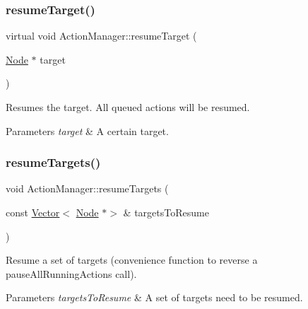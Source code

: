 \subsubsection{\texorpdfstring{resume\+Target()}{resumeTarget()}\hspace{0.1cm}{\footnotesize\ttfamily [2/2]}}
{\footnotesize\ttfamily virtual void Action\+Manager\+::resume\+Target (\begin{DoxyParamCaption}\item[{\hyperlink{classNode}{Node} $\ast$}]{target }\end{DoxyParamCaption})\hspace{0.3cm}{\ttfamily [virtual]}}

Resumes the target. All queued actions will be resumed.


\begin{DoxyParams}{Parameters}
{\em target} & A certain target. \\
\hline
\end{DoxyParams}
\mbox{\label{classActionManager_abf8edeb8d4d6454cc428b3569b15c9d9}} 
\subsubsection{\texorpdfstring{resume\+Targets()}{resumeTargets()}\hspace{0.1cm}{\footnotesize\ttfamily [1/2]}}
{\footnotesize\ttfamily void Action\+Manager\+::resume\+Targets (\begin{DoxyParamCaption}\item[{const \hyperlink{classVector}{Vector}$<$ \hyperlink{classNode}{Node} $\ast$$>$ \&}]{targets\+To\+Resume }\end{DoxyParamCaption})}

Resume a set of targets (convenience function to reverse a pause\+All\+Running\+Actions call).


\begin{DoxyParams}{Parameters}
{\em targets\+To\+Resume} & A set of targets need to be resumed. \\
\hline
\end{DoxyParams}
\mbox{\label{classActionManager_ab201024f51c441967bb97b9d5519b038}} 
